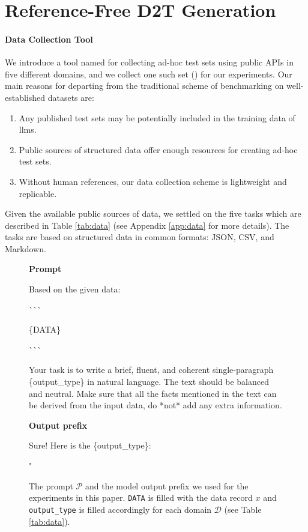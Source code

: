 \section{Reference-Free D2T Generation}
\label{sec:data}

\paragraph{Data Collection Tool}
\label{sec:data_collection}
We introduce a tool named \datatool{} for collecting ad-hoc test sets using public APIs in five different domains, and we collect one such set (\benchmark) for our experiments. Our main reasons for departing from the traditional scheme of benchmarking on well-established datasets are:
\begin{enumerate}
    \item Any published test sets may be potentially included in the training data of \acp{llm}.
    \item Public sources of structured data offer enough resources for creating ad-hoc test sets.
    \item Without human references, our data collection scheme is lightweight and replicable.
\end{enumerate}

Given the available public sources of data, we settled on the five tasks which are described in Table \ref{tab:data} (see Appendix \ref{app:data} for more details). The tasks are based on structured data in common formats: JSON, CSV, and Markdown.


\begin{figure}[t]
    \centering
    \small
    \textbf{Prompt}
    \begin{verbatimbox}
        Based on the given data:

        \`{}\`{}\`{}

        \{DATA\}

        \`{}\`{}\`{}

        Your task is to write a brief, fluent, and
        coherent single-paragraph \{output\_type\} in natural
        language. The text should be balanced and neutral.
        Make sure that all the facts mentioned in the text
        can be derived from the input data, do *not* add
        any extra information.
    \end{verbatimbox}
    \textbf{Output prefix}
    \begin{verbatimbox}
        Sure! Here is the \{output\_type\}:

        "
    \end{verbatimbox}
    \caption{The prompt $\mathcal{P}$ and the model output prefix we used for the experiments in this paper. \texttt{DATA} is filled with the data record  $x$ and \texttt{output\_type} is filled accordingly for each domain $\mathcal{D}$ (see Table \ref{tab:data}).}
    \label{fig:quintd:prompt}
\end{figure}



